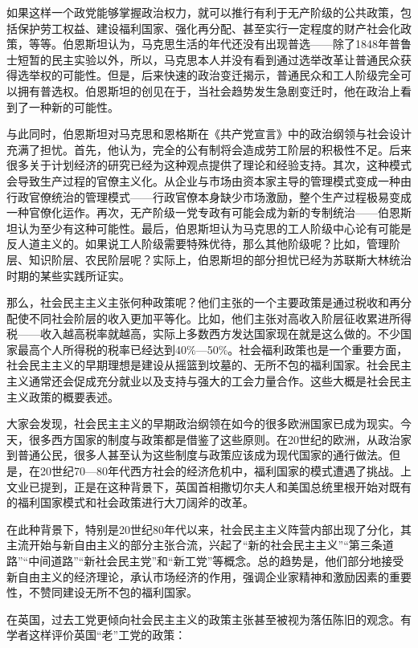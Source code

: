 如果这样一个政党能够掌握政治权力，就可以推行有利于无产阶级的公共政策，包括保护劳工权益、建设福利国家、强化再分配、甚至实行一定程度的财产社会化政策，等等。伯恩斯坦认为，马克思生活的年代还没有出现普选——除了1848年普鲁士短暂的民主实验以外，所以，马克思本人并没有看到通过选举改革让普通民众获得选举权的可能性。但是，后来快速的政治变迁揭示，普通民众和工人阶级完全可以拥有普选权。伯恩斯坦的创见在于，当社会趋势发生急剧变迁时，他在政治上看到了一种新的可能性。

与此同时，伯恩斯坦对马克思和恩格斯在《共产党宣言》中的政治纲领与社会设计充满了担忧。首先，他认为，完全的公有制将会造成劳工阶层的积极性不足。后来很多关于计划经济的研究已经为这种观点提供了理论和经验支持。其次，这种模式会导致生产过程的官僚主义化。从企业与市场由资本家主导的管理模式变成一种由行政官僚统治的管理模式——行政官僚本身缺少市场激励，整个生产过程极易变成一种官僚化运作。再次，无产阶级一党专政有可能会成为新的专制统治——伯恩斯坦认为至少有这种可能性。最后，伯恩斯坦认为马克思的工人阶级中心论有可能是反人道主义的。如果说工人阶级需要特殊优待，那么其他阶级呢？比如，管理阶层、知识阶层、农民阶层呢？实际上，伯恩斯坦的部分担忧已经为苏联斯大林统治时期的某些实践所证实。

那么，社会民主主义主张何种政策呢？他们主张的一个主要政策是通过税收和再分配使不同社会阶层的收入更加平等化。比如，他们主张对高收入阶层征收累进所得税——收入越高税率就越高，实际上多数西方发达国家现在就是这么做的。不少国家最高个人所得税的税率已经达到40\%—50\%。社会福利政策也是一个重要方面，社会民主主义的早期理想是建设从摇篮到坟墓的、无所不包的福利国家。社会民主主义通常还会促成充分就业以及支持与强大的工会力量合作。这些大概是社会民主主义政策的概要表述。

大家会发现，社会民主主义的早期政治纲领在如今的很多欧洲国家已成为现实。今天，很多西方国家的制度与政策都是借鉴了这些原则。在20世纪的欧洲，从政治家到普通公民，很多人甚至认为这些制度与政策应该成为现代国家的通行做法。但是，在20世纪70—80年代西方社会的经济危机中，福利国家的模式遭遇了挑战。上文业已提到，正是在这种背景下，英国首相撒切尔夫人和美国总统里根开始对既有的福利国家模式和社会政策进行大刀阔斧的改革。

在此种背景下，特别是20世纪80年代以来，社会民主主义阵营内部出现了分化，其主流开始与新自由主义的部分主张合流，兴起了“新的社会民主主义”“第三条道路”“中间道路”“新社会民主党”和“新工党”等概念。总的趋势是，他们部分地接受新自由主义的经济理论，承认市场经济的作用，强调企业家精神和激励因素的重要性，不赞同建设无所不包的福利国家。

在英国，过去工党更倾向社会民主主义的政策主张甚至被视为落伍陈旧的观念。有学者这样评价英国“老”工党的政策：

